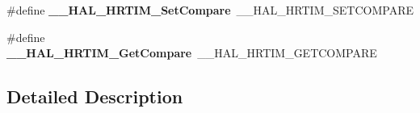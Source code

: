 \begin{DoxyCompactItemize}
\item 
\hypertarget{group___h_a_l___h_r_t_i_m___aliased___macros_ga3a834f00e6fc6eb601cf28f3ecca47d9}{\#define {\bfseries \-\_\-\-\_\-\-H\-A\-L\-\_\-\-H\-R\-T\-I\-M\-\_\-\-Set\-Compare}~\-\_\-\-\_\-\-H\-A\-L\-\_\-\-H\-R\-T\-I\-M\-\_\-\-S\-E\-T\-C\-O\-M\-P\-A\-R\-E}\label{group___h_a_l___h_r_t_i_m___aliased___macros_ga3a834f00e6fc6eb601cf28f3ecca47d9}

\item 
\hypertarget{group___h_a_l___h_r_t_i_m___aliased___macros_ga7db344eedd73f9ceccd648e9d43e6ed7}{\#define {\bfseries \-\_\-\-\_\-\-H\-A\-L\-\_\-\-H\-R\-T\-I\-M\-\_\-\-Get\-Compare}~\-\_\-\-\_\-\-H\-A\-L\-\_\-\-H\-R\-T\-I\-M\-\_\-\-G\-E\-T\-C\-O\-M\-P\-A\-R\-E}\label{group___h_a_l___h_r_t_i_m___aliased___macros_ga7db344eedd73f9ceccd648e9d43e6ed7}

\end{DoxyCompactItemize}


\subsection{Detailed Description}
